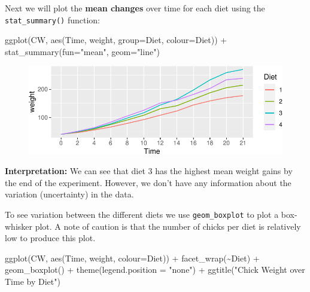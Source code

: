 \documentclass[
  letterpaper,
  DIV=11,
  numbers=noendperiod]{scrreprt}
\newenvironment{Shaded}{\begin{snugshade}}{\end{snugshade}}
\newcommand{\AttributeTok}[1]{\textcolor[rgb]{0.40,0.45,0.13}{#1}}
\newcommand{\FunctionTok}[1]{\textcolor[rgb]{0.28,0.35,0.67}{#1}}
\newcommand{\NormalTok}[1]{\textcolor[rgb]{0.00,0.23,0.31}{#1}}
\newcommand{\SpecialCharTok}[1]{\textcolor[rgb]{0.37,0.37,0.37}{#1}}
\newcommand{\StringTok}[1]{\textcolor[rgb]{0.13,0.47,0.30}{#1}}
\theoremstyle{definition}
\theoremstyle{plain}
\theoremstyle{plain}
\theoremstyle{remark}
\begin{document}
Next we will plot the \textbf{mean changes} over time for each diet
using the \texttt{stat\_summary()} function:

\begin{Shaded}
\begin{Highlighting}[]
\FunctionTok{ggplot}\NormalTok{(CW, }\FunctionTok{aes}\NormalTok{(Time, weight, }
               \AttributeTok{group=}\NormalTok{Diet, }\AttributeTok{colour=}\NormalTok{Diet)) }\SpecialCharTok{+}
  \FunctionTok{stat\_summary}\NormalTok{(}\AttributeTok{fun=}\StringTok{"mean"}\NormalTok{, }\AttributeTok{geom=}\StringTok{"line"}\NormalTok{) }
\end{Highlighting}
\end{Shaded}

\begin{figure}[H]

{\centering \includegraphics{./01-Introduction-to-R_files/figure-pdf/meanlinesPlot-1.pdf}

}

\end{figure}

\textbf{Interpretation:} We can see that diet 3 has the highest mean
weight gains by the end of the experiment. However, we don't have any
information about the variation (uncertainty) in the data.

To see variation between the different diets we use
\texttt{geom\_boxplot} to plot a box-whisker plot. A note of caution is
that the number of chicks per diet is relatively low to produce this
plot.

\begin{Shaded}
\begin{Highlighting}[]
\FunctionTok{ggplot}\NormalTok{(CW, }\FunctionTok{aes}\NormalTok{(Time, weight, }\AttributeTok{colour=}\NormalTok{Diet)) }\SpecialCharTok{+}
  \FunctionTok{facet\_wrap}\NormalTok{(}\SpecialCharTok{\textasciitilde{}}\NormalTok{Diet) }\SpecialCharTok{+}
  \FunctionTok{geom\_boxplot}\NormalTok{() }\SpecialCharTok{+}
  \FunctionTok{theme}\NormalTok{(}\AttributeTok{legend.position =} \StringTok{"none"}\NormalTok{) }\SpecialCharTok{+}
  \FunctionTok{ggtitle}\NormalTok{(}\StringTok{"Chick Weight over Time by Diet"}\NormalTok{)}
\end{Highlighting}
\end{Shaded}
\end{document}
